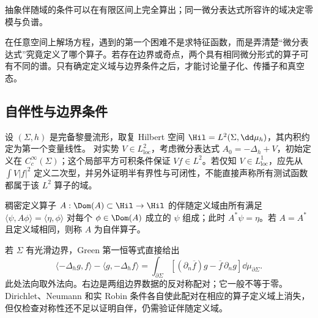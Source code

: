 
抽象伴随域的条件可以在有限区间上完全算出；同一微分表达式所容许的域决定零模与负谱。






在任意空间上解场方程，遇到的第一个困难不是求特征函数，而是弄清楚“微分表达式”究竟定义了哪个算子。若存在边界或奇点，两个具有相同微分形式的算子可有不同的谱。只有确定定义域与边界条件之后，才能讨论量子化、传播子和真空态。

\subsection{自伴性与边界条件}
\label{sec:ghs-self-adjoint-boundary}

设 $(\Sigma,h)$ 是完备黎曼流形，取复 Hilbert 空间 $\Hil=L^2(\Sigma,\dd\mu_h)$，其内积约定为第一个变量线性。
对实势 $V\in L^2_{\mathrm{loc}}$，考虑微分表达式 $A_0=-\Delta_h+V$，初始定义在 $C_c^\infty(\Sigma)$；这个局部平方可积条件保证 $Vf\in L^2$。若仅知 $V\in L^1_{\mathrm{loc}}$，应先从 $\int V|f|^2$ 定义二次型，并另外证明半有界性与可闭性，不能直接声称所有测试函数都属于该 $L^2$ 算子的域。

\begin{definition}[算子定义域与伴随]
稠密定义算子 $A:\Dom(A)\subset\Hil\to\Hil$ 的伴随定义域由所有满足
$\langle\psi, A\phi\rangle=\langle\eta,\phi\rangle$ 对每个 $\phi\in\Dom(A)$ 成立的 $\psi$ 组成；此时 $A^*\psi=\eta$。若 $A=A^*$ 且定义域相同，则称 $A$ 为自伴算子。
\end{definition}

若 $\Sigma$ 有光滑边界，Green 第一恒等式直接给出
\begin{equation}\label{eq:ghs-green-boundary-identity}
 \langle-\Delta_hg, f\rangle-\langle g,-\Delta_hf\rangle
 =\int_{\partial\Sigma}
 \left[(\partial_n\overline f)g-\overline f\,\partial_n g\right]\dd\mu_{\partial\Sigma}.
\end{equation}
此处法向取外法向。右边是两组边界数据的反对称配对；它一般不等于零。Dirichlet、Neumann 和实 Robin 条件各自使此配对在相应的算子定义域上消失，但仅检查对称性还不足以证明自伴，仍需验证伴随定义域。

